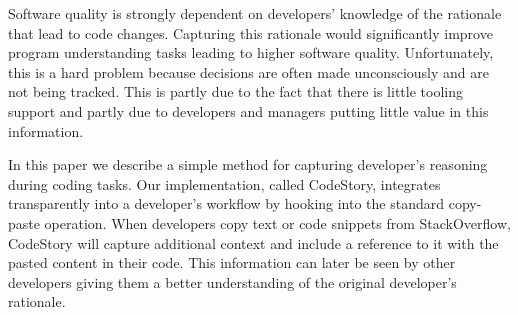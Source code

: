\documentclass[../manifest.tex]{subfiles}
\begin{document}
Software quality is strongly dependent on developers' knowledge of the rationale that lead to code changes. Capturing this rationale would significantly improve program understanding tasks leading to higher software quality. Unfortunately, this is a hard problem because decisions are often made unconsciously and are not being tracked. This is partly due to the fact that there is little tooling support and partly due to developers and managers putting little value in this information.

In this paper we describe a simple method for capturing developer's reasoning
during coding tasks. Our implementation, called CodeStory, integrates transparently
into a developer's workflow by hooking into the standard copy-paste operation. When developers copy text or code snippets from StackOverflow, CodeStory will capture additional context and include a reference to it with the pasted content in their code. This information can later be seen by other developers giving them a better understanding of the original developer's rationale.
\end{document}
